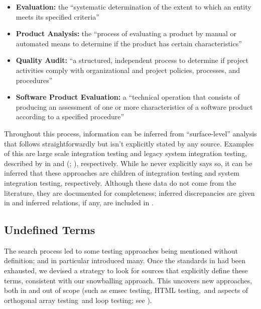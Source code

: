     \begin{itemize}
        \item \textbf{Evaluation:} the ``systematic determination of the extent
              to which an entity meets its specified criteria''
              \citep[p.~167]{IEEE2017}
        \item \textbf{Product Analysis:} the ``process of evaluating a product by
              manual or automated means to determine if the product has certain
              characteristics'' \citep[p.~343]{IEEE2017}
        \item \textbf{Quality Audit:} ``a structured, independent process to
              determine if project activities comply with organizational and
              project policies, processes, and procedures'' \citep[p.~361]{IEEE2017}
        \item \textbf{Software Product Evaluation:} a ``technical operation that
              consists of producing an assessment of one or more characteristics
              of a software product according to a specified procedure''
              \citep[p.~424]{IEEE2017}
    \end{itemize}

    \label{infers}
    Throughout this process, information can be inferred from ``surface-level''
    analysis that follows straightforwardly but isn't explicitly stated by any
    source. Examples of this are large scale integration testing and legacy
    system integration testing, described by \citeauthor{Gerrard2000a} in
    \citeyearpar[p.~30]{Gerrard2000b} and (\citeyear[Tab.~2]{Gerrard2000a};
    \citeyear[Tab.~1]{Gerrard2000b}), respectively. While he never explicitly
    says so, it can be inferred that these approaches are children of
    integration testing and system integration testing, respectively.
    Although these data do not come from the literature, they are documented
    for completeness; inferred discrepancies are given in 
    and inferred relations, if any, are included in \recFigs{}.
\fi

\subsection{Undefined Terms}
\label{undef-terms}

The search process led to some testing approaches being
mentioned without definition;
\citep{IEEE2022} and \citep{Firesmith2015} in particular introduced many.
Once the standards in  had been exhausted, we devised a strategy to
look for sources that explicitly define these terms, consistent with
our snowballing approach. This uncovers new approaches, both in and out of
scope (such as \acf{emsec} testing\ifnotpaper, HTML testing,\fi\ and aspects
of orthogonal array testing\ifnotpaper\ and loop testing\fi; see ).

